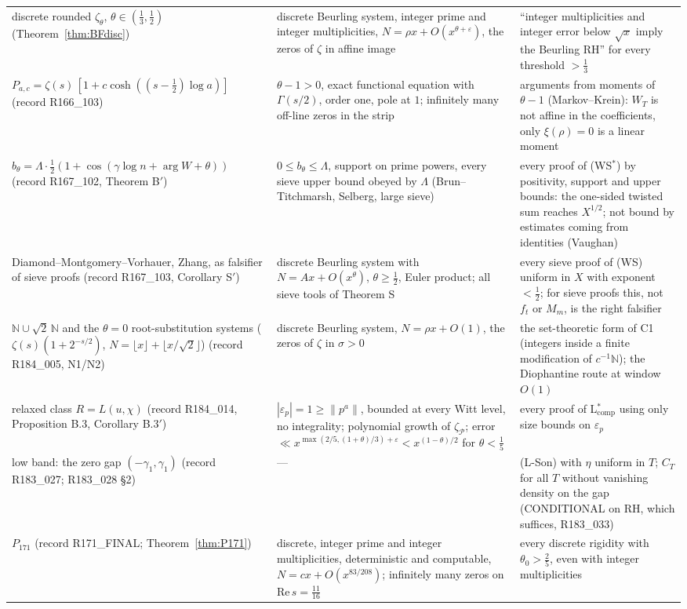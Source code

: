 \documentclass[11pt]{amsart}
\theoremstyle{definition}
\theoremstyle{remark}
\newcommand{\Rel}{\mathrm{Re}\,}
\begin{document}
\begin{table}[ht]
\begin{tabularx}{\textwidth}{@{}p{3.3cm}p{4.0cm}Y@{}}
discrete rounded $\zeta_\theta$, $\theta\in(\frac13,\frac12)$ (Theorem~\ref{thm:BFdisc}) & discrete Beurling system, integer prime and integer multiplicities, $N=\rho x+O(x^{\theta+\varepsilon})$, the zeros of $\zeta$ in affine image & ``integer multiplicities and integer error below $\sqrt x$ imply the Beurling RH'' for every threshold $>\frac13$ \\
$P_{a,c}=\zeta(s)\,[1+c\cosh((s-\frac12)\log a)]$ (record R166\_103) & $\theta-1>0$, exact functional equation with $\Gamma(s/2)$, order one, pole at $1$; infinitely many off-line zeros in the strip & arguments from moments of $\theta-1$ (Markov--Krein): $W_T$ is not affine in the coefficients, only $\xi(\rho)=0$ is a linear moment \\
$b_\theta=\Lambda\cdot\frac12(1+\cos(\gamma\log n+\arg W+\theta))$ (record R167\_102, Theorem B$'$) & $0\le b_\theta\le\Lambda$, support on prime powers, every sieve upper bound obeyed by $\Lambda$ (Brun--Titchmarsh, Selberg, large sieve) & every proof of (WS$^*$) by positivity, support and upper bounds: the one-sided twisted sum reaches $X^{1/2}$; not bound by estimates coming from identities (Vaughan) \\
Diamond--Montgomery--Vorhauer, Zhang, as falsifier of sieve proofs (record R167\_103, Corollary S$'$) & discrete Beurling system with $N=Ax+O(x^\theta)$, $\theta\ge\frac12$, Euler product; all sieve tools of Theorem S & every sieve proof of (WS) uniform in $X$ with exponent $<\frac12$; for sieve proofs this, not $f_t$ or $M_m$, is the right falsifier \\
$\mathbb N\cup\sqrt2\,\mathbb N$ and the $\theta=0$ root-substitution systems ($\zeta(s)(1+2^{-s/2})$, $N=\lfloor x\rfloor+\lfloor x/\sqrt2\rfloor$) (record R184\_005, N1/N2) & discrete Beurling system, $N=\rho x+O(1)$, the zeros of $\zeta$ in $\sigma>0$ & the set-theoretic form of C1 (integers inside a finite modification of $c^{-1}\mathbb N$); the Diophantine route at window $O(1)$ \\
relaxed class $R=L(u,\chi)$ (record R184\_014, Proposition B.3, Corollary B.3$'$) & $|\varepsilon_p|=1\ge\|p^a\|$, bounded at every Witt level, no integrality; polynomial growth of $\zeta_{\mathcal P}$; error $\ll x^{\max(2/5,(1+\theta)/3)+\varepsilon}<x^{(1-\theta)/2}$ for $\theta<\frac15$ & every proof of L$^*_{\mathrm{comp}}$ using only size bounds on $\varepsilon_p$ \\
low band: the zero gap $(-\gamma_1,\gamma_1)$ (record R183\_027; R183\_028 \S2) & --- & (L-Son) with $\eta$ uniform in $T$; $C_T$ for all $T$ without vanishing density on the gap (CONDITIONAL on RH, which suffices, R183\_033) \\
$P_{171}$ (record R171\_FINAL; Theorem~\ref{thm:P171}) & discrete, integer prime and integer multiplicities, deterministic and computable, $N=cx+O(x^{83/208})$; infinitely many zeros on $\Rel s=\frac{11}{16}$ & every discrete rigidity with $\theta_0>\frac25$, even with integer multiplicities \\
\bottomrule
\end{tabularx}
\end{table}
\end{document}
